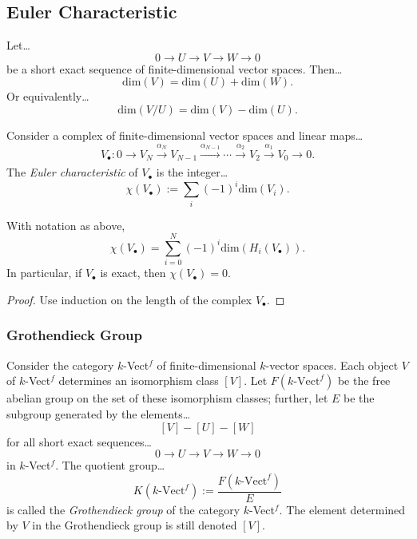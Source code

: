 \subsection{Euler Characteristic}\label{eulercharacteristic}

\begin{proposition}
Let\dots
$$0 \longrightarrow U \longrightarrow V \longrightarrow W \longrightarrow 0$$
be a short exact sequence of finite-dimensional vector spaces. Then\dots
$$\textrm{dim}(V) = \textrm{dim}(U) + \textrm{dim}(W).$$
Or equivalently\dots
$$\textrm{dim}(V / U) = \textrm{dim}(V) - \textrm{dim}(U).$$
\end{proposition}

\noindent Consider a complex of finite-dimensional vector spaces and linear maps\dots
$$V_{\bullet}: 0 \longrightarrow V_N \xrightarrow[]{\alpha_N} V_{N-1} \xrightarrow[]{\alpha_{N-1}} \cdots \xrightarrow[]{\alpha_2} V_{2} \xrightarrow[]{\alpha_1} V_{0} \longrightarrow 0.$$
The \emph{Euler characteristic} of $V_{\bullet}$ is the integer\dots
$$\chi(V_{\bullet}) := \sum_{i}(-1)^{i}\textrm{dim}(V_i).$$

\begin{proposition}
With notation as above,
$$\chi(V_{\bullet}) = \sum_{i=0}^{N}(-1)^{i}\textrm{dim}(H_i(V_{\bullet})).$$
In particular, if $V_{\bullet}$ is exact, then $\chi(V_{\bullet}) = 0$.
\end{proposition}

\begin{proof}
Use induction on the length of the complex $V_{\bullet}$.
\end{proof}

\subsubsection{Grothendieck Group}\label{grothendieckgroup}
Consider the category $k$-Vect$^{f}$ of finite-dimensional $k$-vector spaces. Each object $V$ of $k$-Vect$^f$ determines an isomorphism class $[V]$.
Let $F(k\textrm{-Vect}^f)$ be the free abelian group on the set of these isomorphism classes; further, let $E$ be the subgroup generated by the elements\dots
$$[V] -[U] - [W]$$
for all short exact sequences\dots
$$0 \longrightarrow U \longrightarrow V \longrightarrow W \longrightarrow 0$$
in $k$-Vect$^f$. The quotient group\dots
$$K(k\textrm{-Vect}^f) := \frac{F(k\textrm{-Vect}^f)}{E}$$
is called the \emph{Grothendieck group} of the category $k$-Vect$^f$. The element determined by $V$ in
the Grothendieck group is still denoted $[V]$.\newline

